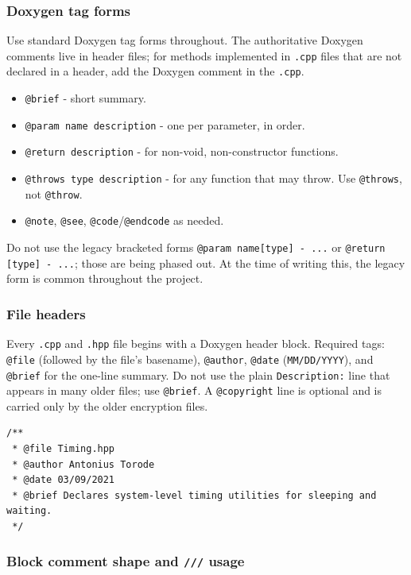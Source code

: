 \subsubsection*{Doxygen tag forms}

Use standard Doxygen tag forms throughout. The authoritative Doxygen comments live in header files; for methods implemented in \texttt{.cpp} files that are not declared in a header, add the Doxygen comment in the \texttt{.cpp}.
\begin{itemize}\itemsep0em
    \item \texttt{@brief} - short summary.
    \item \texttt{@param name description} - one per parameter, in order.
    \item \texttt{@return description} - for non-void, non-constructor functions.
    \item \texttt{@throws type description} - for any function that may throw. Use \texttt{@throws}, not \texttt{@throw}.
    \item \texttt{@note}, \texttt{@see}, \texttt{@code}/\texttt{@endcode} as needed.
\end{itemize}
Do not use the legacy bracketed forms \texttt{@param name[type] - ...} or \texttt{@return [type] - ...}; those are being phased out. At the time of writing this, the legacy form is common throughout the project.

\subsubsection*{File headers}

Every \texttt{.cpp} and \texttt{.hpp} file begins with a Doxygen header block. Required tags: \texttt{@file} (followed by the file's basename), \texttt{@author}, \texttt{@date} (\texttt{MM/DD/YYYY}), and \texttt{@brief} for the one-line summary. Do not use the plain \texttt{Description:} line that appears in many older files; use \texttt{@brief}. A \texttt{@copyright} line is optional and is carried only by the older encryption files.
\begin{lstlisting}[style=cppstyle]
/**
 * @file Timing.hpp
 * @author Antonius Torode
 * @date 03/09/2021
 * @brief Declares system-level timing utilities for sleeping and waiting.
 */
\end{lstlisting}

\subsubsection*{Block comment shape and \texttt{///} usage}

